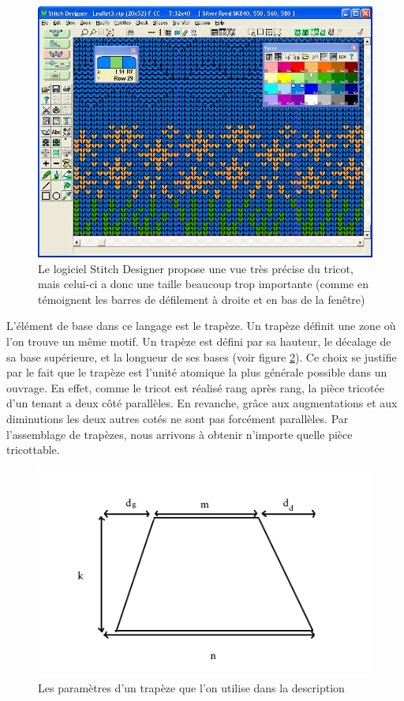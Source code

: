 \documentclass{article}
\begin{document}
\begin{figure}[!ht]
  \centering \includegraphics[scale=0.3]{../img/grid.jpg}
  \caption{Le logiciel Stitch Designer propose une vue très précise du
    tricot, mais celui-ci a donc une taille beaucoup trop importante
    (comme en témoignent les barres de défilement à droite et en bas
    de la fenêtre)}
  \label{logiciel}
\end{figure}

L'élément de base dans ce langage est le trapèze. Un trapèze définit
une zone où l'on trouve un même motif. Un trapèze est défini par sa
hauteur, le décalage de sa base supérieure, et la longueur de ses
bases (voir figure \ref{trapeze}). Ce choix se justifie par le fait
que le trapèze est l'unité atomique la plus générale possible dans un
ouvrage. En effet, comme le tricot est réalisé rang après rang, la pièce
tricotée d'un tenant a deux côté parallèles. En revanche, grâce aux 
augmentations et aux diminutions les deux autres cotés ne sont pas 
forcément parallèles. Par l'assemblage de trapèzes, nous arrivons
à obtenir n'importe quelle pièce tricottable.

\begin{figure}[!ht]
  \centering \includegraphics[scale=0.5]{../img/trapeze.jpg}
  \caption{Les paramètres d'un trapèze que l'on utilise dans la
    description}
  \label{trapeze}
\end{figure}
\end{document}

